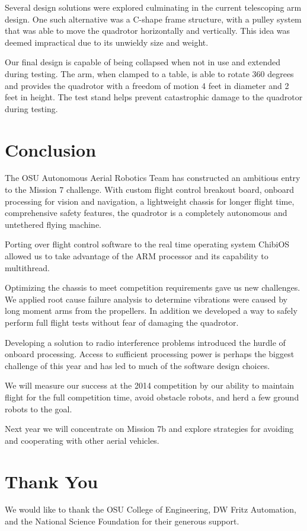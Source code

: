 \documentclass[12pt,letterpaper]{article} \usepackage[margin=1in]{geometry}
\begin{document}
Several design solutions were explored culminating in the current telescoping
arm design. One such alternative was a C-shape frame structure, with a pulley
system that was able to move the quadrotor horizontally and vertically. This
idea was deemed impractical due to its unwieldy size and weight.

Our final design is capable of being collapsed when not in use and extended
during testing. The arm, when clamped to a table, is able to rotate 360 degrees
and provides the quadrotor with a freedom of motion 4 feet in diameter and
2 feet in height. The test stand helps prevent catastrophic damage to the
quadrotor during testing.


\section*{Conclusion}

The OSU Autonomous Aerial Robotics Team has constructed an ambitious entry to
the Mission 7 challenge. With custom flight control breakout board, onboard
processing for vision and navigation, a lightweight chassis for longer
flight time, comprehensive safety features, the quadrotor is a completely
autonomous and untethered flying machine.

Porting over flight control software to the real time operating system ChibiOS
allowed us to take advantage of the ARM processor and its capability to
multithread.

Optimizing the chassis to meet competition requirements gave us new challenges.
We applied root cause failure analysis to determine vibrations were caused by
long moment arms from the propellers. In addition we developed a way to safely
perform full flight tests without fear of damaging the quadrotor.

Developing a solution to radio interference problems introduced the hurdle of
onboard processing. Access to sufficient processing power is perhaps the
biggest challenge of this year and has led to much of the software design
choices.

We will measure our success at the 2014 competition by our ability to maintain
flight for the full competition time, avoid obstacle robots, and herd a few
ground robots to the goal.

Next year we will concentrate on Mission 7b and explore strategies for avoiding
and cooperating with other aerial vehicles.


\section*{Thank You}

We would like to thank the OSU College of Engineering, DW Fritz Automation, and
the National Science Foundation for their generous support.
\end{document}
